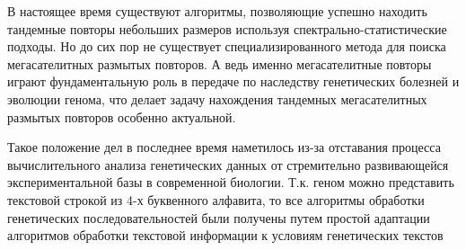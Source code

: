 В настоящее время существуют алгоритмы, позволяющие успешно находить тандемные
повторы небольших размеров используя спектрально-статистические подходы.
Но до сих пор не существует специализированного метода для поиска мегасателитных
размытых повторов. А ведь именно мегасателитные повторы играют фундаментальную
роль в передаче по наследству генетических болезней и эволюции генома, что делает
задачу нахождения тандемных мегасателитных размытых повторов особенно актуальной.

Такое положение дел в последнее время наметилось из-за отставания
процесса вычислительного анализа генетических данных от стремительно развивающейся
экспериментальной базы в современной биологии. Т.к. геном можно представить
текстовой строкой из 4-х буквенного алфавита, то все алгоритмы обработки
генетических последовательностей были получены путем простой адаптации алгоритмов
обработки текстовой информации к условиям генетических текстов

\clearpage
